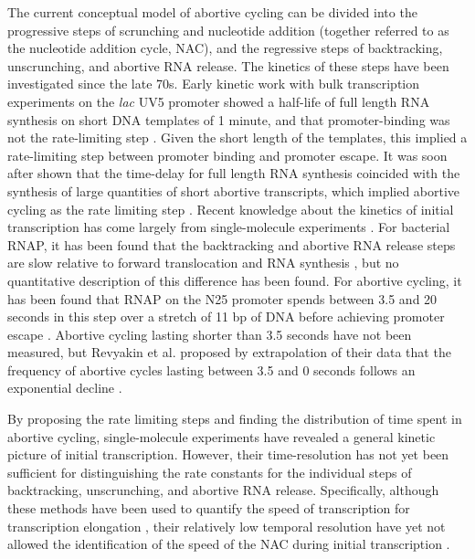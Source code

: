 The current conceptual model of abortive cycling can be divided into the
progressive steps of scrunching and nucleotide addition (together referred to
as the nucleotide addition cycle, NAC), and the regressive steps of
backtracking, unscrunching, and abortive RNA release. The kinetics of these
steps have been investigated since the late 70s. Early kinetic work with
bulk transcription experiments on the \textit{lac} UV5 promoter showed a
half-life of full length RNA synthesis on short DNA templates of 1 minute, and
that promoter-binding was not the rate-limiting step \cite{stefano_lac_1979}.
Given the short length of the templates, this implied a rate-limiting step
between promoter binding and promoter escape. It was soon after shown that the
time-delay for full length RNA synthesis coincided with the synthesis of large
quantities of short abortive transcripts, which implied abortive cycling as
the rate limiting step \cite{munson_abortive_1981}. Recent knowledge about the
kinetics of initial transcription has come largely from single-molecule
experiments \cite{revyakin_abortive_2006, kapanidis_initial_2006,
tang_real-time_2009, kapanidis_retention_2005, margeat_direct_2006}. For
bacterial RNAP, it has been found that the backtracking and abortive RNA
release steps are slow relative to forward translocation and RNA synthesis
\cite{revyakin_abortive_2006, margeat_direct_2006}, but no quantitative
description of this difference has been found. For abortive cycling, it has
been found that RNAP on the N25 promoter spends between 3.5 and 20 seconds in
this step over a stretch of 11 bp of DNA before achieving promoter escape
\cite{revyakin_abortive_2006}. Abortive cycling lasting shorter than 3.5 seconds
have not been measured, but Revyakin et al. proposed by extrapolation of their
data that the frequency of abortive cycles lasting between 3.5 and 0 seconds
follows an exponential decline \cite{revyakin_abortive_2006}.  

By proposing the rate limiting steps and finding the distribution of time
spent in abortive cycling, single-molecule experiments have revealed a general
kinetic picture of initial transcription. However, their time-resolution has
not yet been sufficient for distinguishing the rate constants for the
individual steps of backtracking, unscrunching, and abortive RNA release.
Specifically, although these methods have been used to quantify the speed of
transcription for transcription elongation \cite{wang_force_1998,
tolic-norrelykke_diversity_2004}, their relatively low temporal resolution
have yet not allowed the identification of the speed of the NAC during initial
transcription \cite{revyakin_abortive_2006, margeat_direct_2006}.

